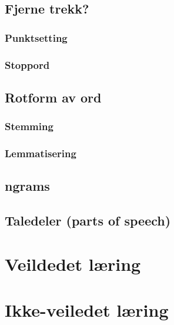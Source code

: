 \documentclass[
]{book}
\begin{document}
\hypertarget{fjerne-trekk}{%
\section{Fjerne trekk?}\label{fjerne-trekk}}

\hypertarget{punktsetting}{%
\subsection{Punktsetting}\label{punktsetting}}

\hypertarget{stoppord}{%
\subsection{Stoppord}\label{stoppord}}

\hypertarget{rotform-av-ord}{%
\section{Rotform av ord}\label{rotform-av-ord}}

\hypertarget{stemming}{%
\subsection{Stemming}\label{stemming}}

\hypertarget{lemmatisering}{%
\subsection{Lemmatisering}\label{lemmatisering}}

\hypertarget{ngrams}{%
\section{ngrams}\label{ngrams}}

\hypertarget{taledeler-parts-of-speech}{%
\section{Taledeler (parts of speech)}\label{taledeler-parts-of-speech}}

\hypertarget{sup}{%
\chapter{Veildedet læring}\label{sup}}

\hypertarget{unsup}{%
\chapter{Ikke-veiledet læring}\label{unsup}}
\end{document}

